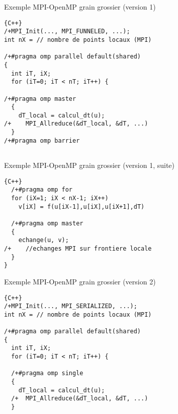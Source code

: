\documentclass{beamer}
\begin{document}
\begin{frame}[fragile]
Exemple MPI-OpenMP grain grossier
(version 1)


\begin{lstlisting}[firstnumber=1]{C++}
/+MPI_Init(..., MPI_FUNNELED, ...);
int nX = // nombre de points locaux (MPI)
 
/+#pragma omp parallel default(shared)
{
  int iT, iX;
  for (iT=0; iT < nT; iT++) {
  
/+#pragma omp master
  {
    dT_local = calcul_dt(u);
/+    MPI_Allreduce(&dT_local, &dT, ...)
  }
/+#pragma omp barrier
  
\end{lstlisting}

\end{frame}
\begin{frame}[fragile]
	Exemple MPI-OpenMP grain grossier (version 1, suite)
	
	
\begin{lstlisting}[firstnumber=15]{C++}
  /+#pragma omp for
  for (iX=1; iX < nX-1; iX++)
    v[iX] = f(u[iX-1],u[iX],u[iX+1],dT)

  /+#pragma omp master
  {
    echange(u, v);
/+    //echanges MPI sur frontiere locale    
  }
}
\end{lstlisting}

\end{frame}
\begin{frame}[fragile]
	Exemple MPI-OpenMP grain grossier (version 2)
	
	
	\begin{lstlisting}[firstnumber=1]{C++}
/+MPI_Init(..., MPI_SERIALIZED, ...);
int nX = // nombre de points locaux (MPI)
	
/+#pragma omp parallel default(shared)
{
  int iT, iX;
  for (iT=0; iT < nT; iT++) {

  /+#pragma omp single
  {
    dT_local = calcul_dt(u);
  /+  MPI_Allreduce(&dT_local, &dT, ...)
  }
	
\end{lstlisting}
	
\end{frame}
\end{document}
